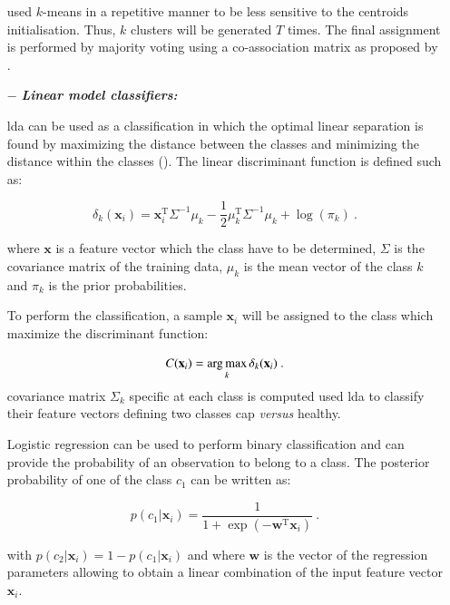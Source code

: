\begin{enumerate}[leftmargin=*]
\cite{Tiwari2008,Viswanath2008,Viswanath2008a} used $k$-means in a repetitive manner to be less sensitive to the centroids initialisation. Thus, $k$ clusters will be generated $T$ times. The final assignment is performed by majority voting using a co-association matrix as proposed by \cite{Fred2005}.

\item[$-$] \textbf{\textit{Linear model classifiers:}} 

\Acf{lda} can be used as a classification in which the optimal linear separation is found by maximizing the distance between the classes and minimizing the distance within the classes (\cite{Friedman1989}). The linear discriminant function is defined such as:

\begin{equation}
	\delta_{k}(\mathbf{x}_i) = \mathbf{x}_i^{\text{T}} \Sigma^{-1} \mu_k - \frac{1}{2} \mu_{k}^{\text{T}} \Sigma^{-1} \mu_k + \log (\pi_k) \ .
	\label{eq:ldafun}
\end{equation}

\noindent where $\mathbf{x}$ is a feature vector which the class have to be determined, $\Sigma$ is the covariance matrix of the training data, $\mu_k$ is the mean vector of the class $k$ and $\pi_k$ is the prior probabilities.

To perform the classification, a sample $\mathbf{x}_i$ will be assigned to the class which maximize the discriminant function:

\begin{equation}
	C(\mathbf{x}_i) = \operatorname*{arg\,max}_k \delta_k(\mathbf{x}_i) \ .
	\label{eq:ldaclass}
\end{equation}
covariance matrix $\Sigma_k$ specific at each class is computed
\cite{Antic2013,Chan2003,Niaf2011,Niaf2012,Vos2012} used \ac{lda} to classify their feature vectors defining two classes \ac{cap} \textit{versus} healthy.

Logistic regression can be used to perform binary classification and can provide the probability of an observation to belong to a class. The posterior probability of one of the class $c_1$ can be written as:

\begin{equation}
	p(c_1|\mathbf{x}_i) = \frac{1}{1+\exp(-\mathbf{w}^{\text{T}}\mathbf{x}_i)} \ .
	\label{eq:postprlr}
\end{equation}

\noindent with $p(c_2|\mathbf{x}_i) = 1 - p(c_1|\mathbf{x}_i)$ and where $\mathbf{w}$ is the vector of the regression parameters allowing to obtain a linear combination of the input feature vector $\mathbf{x}_i$.


\end{enumerate}
